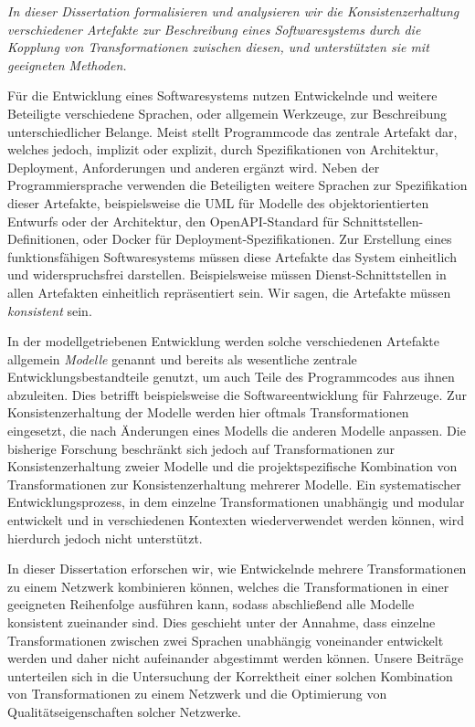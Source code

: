 \emph{In dieser Dissertation formalisieren und analysieren wir die Konsistenzerhaltung verschiedener Artefakte zur Beschreibung eines Softwaresystems durch die Kopplung von Transformationen zwischen diesen, und unterstützten sie mit geeigneten Methoden.}

Für die Entwicklung eines Softwaresystems nutzen Entwickelnde und weitere Beteiligte verschiedene Sprachen, oder allgemein Werkzeuge, zur Beschreibung unterschiedlicher Belange.
Meist stellt Programmcode das zentrale Artefakt dar, welches jedoch, implizit oder explizit, durch Spezifikationen von Architektur, Deployment, Anforderungen und anderen ergänzt wird.
Neben der Programmiersprache verwenden die Beteiligten weitere Sprachen zur Spezifikation dieser Artefakte, beispielsweise die \acrshort{UML} für Modelle des objektorientierten Entwurfs oder der Architektur, den OpenAPI-Standard für Schnittstellen-Definitionen, oder Docker für Deployment-Spezifikationen.
Zur Erstellung eines funktionsfähigen Softwaresystems müssen diese Artefakte das System einheitlich und widerspruchsfrei darstellen.
Beispielsweise müssen Dienst-Schnittstellen in allen Artefakten einheitlich repräsentiert sein.
Wir sagen, die Artefakte müssen \emph{konsistent} sein.

In der modellgetriebenen Entwicklung werden solche verschiedenen Artefakte allgemein \emph{Modelle} genannt und bereits als wesentliche zentrale Entwicklungsbestandteile genutzt, um auch Teile des Programmcodes aus ihnen abzuleiten.
Dies betrifft beispielsweise die Softwareentwicklung für Fahrzeuge. %
Zur Konsistenzerhaltung der Modelle werden hier oftmals Transformationen eingesetzt, die nach Änderungen eines Modells die anderen Modelle anpassen.
Die bisherige Forschung beschränkt sich jedoch auf Transformationen zur Konsistenzerhaltung zweier Modelle %
und die projektspezifische Kombination von Transformationen zur Konsistenzerhaltung mehrerer Modelle. %
Ein systematischer Entwicklungsprozess, in dem einzelne Transformationen unabhängig und modular entwickelt und in verschiedenen Kontexten wiederverwendet werden können, wird hierdurch jedoch nicht unterstützt.

In dieser Dissertation erforschen wir, wie Entwickelnde mehrere Transformationen zu einem Netzwerk kombinieren können, welches die Transformationen in einer geeigneten Reihenfolge ausführen kann, sodass abschließend alle Modelle konsistent zueinander sind. %
Dies geschieht unter der Annahme, dass einzelne Transformationen zwischen zwei Sprachen unabhängig voneinander entwickelt werden und daher nicht aufeinander abgestimmt werden können.
Unsere Beiträge unterteilen sich in die Untersuchung der Korrektheit einer solchen Kombination von Transformationen zu einem Netzwerk und die Optimierung von Qualitätseigenschaften solcher Netzwerke.


